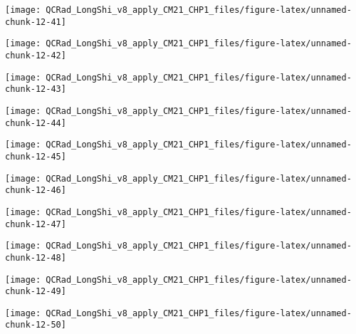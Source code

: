 \documentclass[
  10pt,
  a4paper,oneside]{article}
\begin{document}
\begin{center}\texttt{[image: QCRad\_LongShi\_v8\_apply\_CM21\_CHP1\_files/figure-latex/unnamed-chunk-12-41]} \end{center}

\begin{center}\texttt{[image: QCRad\_LongShi\_v8\_apply\_CM21\_CHP1\_files/figure-latex/unnamed-chunk-12-42]} \end{center}

\begin{center}\texttt{[image: QCRad\_LongShi\_v8\_apply\_CM21\_CHP1\_files/figure-latex/unnamed-chunk-12-43]} \end{center}

\begin{center}\texttt{[image: QCRad\_LongShi\_v8\_apply\_CM21\_CHP1\_files/figure-latex/unnamed-chunk-12-44]} \end{center}

\begin{center}\texttt{[image: QCRad\_LongShi\_v8\_apply\_CM21\_CHP1\_files/figure-latex/unnamed-chunk-12-45]} \end{center}

\begin{center}\texttt{[image: QCRad\_LongShi\_v8\_apply\_CM21\_CHP1\_files/figure-latex/unnamed-chunk-12-46]} \end{center}

\begin{center}\texttt{[image: QCRad\_LongShi\_v8\_apply\_CM21\_CHP1\_files/figure-latex/unnamed-chunk-12-47]} \end{center}

\begin{center}\texttt{[image: QCRad\_LongShi\_v8\_apply\_CM21\_CHP1\_files/figure-latex/unnamed-chunk-12-48]} \end{center}

\begin{center}\texttt{[image: QCRad\_LongShi\_v8\_apply\_CM21\_CHP1\_files/figure-latex/unnamed-chunk-12-49]} \end{center}

\begin{center}\texttt{[image: QCRad\_LongShi\_v8\_apply\_CM21\_CHP1\_files/figure-latex/unnamed-chunk-12-50]} \end{center}
\end{document}

